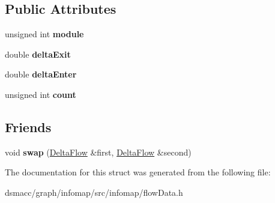 \subsection*{Public Attributes}
\begin{DoxyCompactItemize}
\item 
\mbox{\label{structDeltaFlow_a65194c5dc47a94d750344ad040f70d54}} 
unsigned int {\bfseries module}
\item 
\mbox{\label{structDeltaFlow_aeddf32c410097b1493680b61891556f4}} 
double {\bfseries delta\+Exit}
\item 
\mbox{\label{structDeltaFlow_a9a26c358676ebb93478f8cafa5023dfa}} 
double {\bfseries delta\+Enter}
\item 
\mbox{\label{structDeltaFlow_a765b919b8d84274d3779c5f4cff13255}} 
unsigned int {\bfseries count}
\end{DoxyCompactItemize}
\subsection*{Friends}
\begin{DoxyCompactItemize}
\item 
\mbox{\label{structDeltaFlow_a5b10ab8554ffea90916ccc88cfc125bd}} 
void {\bfseries swap} (\mbox{\hyperlink{structDeltaFlow}{Delta\+Flow}} \&first, \mbox{\hyperlink{structDeltaFlow}{Delta\+Flow}} \&second)
\end{DoxyCompactItemize}


The documentation for this struct was generated from the following file\+:\begin{DoxyCompactItemize}
\item 
dsmacc/graph/infomap/src/infomap/flow\+Data.\+h\end{DoxyCompactItemize}
